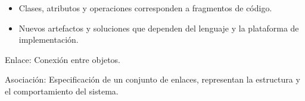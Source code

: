 \documentclass[12pt, twoside, openright]{report} %
\begin{document}
\begin{itemize}
	      \begin{itemize}
		      \item Clases, atributos y operaciones corresponden a fragmentos de
		            código.
		      \item Nuevos artefactos y soluciones que dependen del lenguaje y la
		            plataforma de implementación.
	      \end{itemize}
\end{itemize}

Enlace: Conexión entre objetos.

Asociación: Especificación de un conjunto de enlaces, representan la
estructura y el comportamiento del sistema.
\begin{figure}[H]
	{\def\svgwidth{.5\textwidth}
		}
\end{figure}
\end{document}
